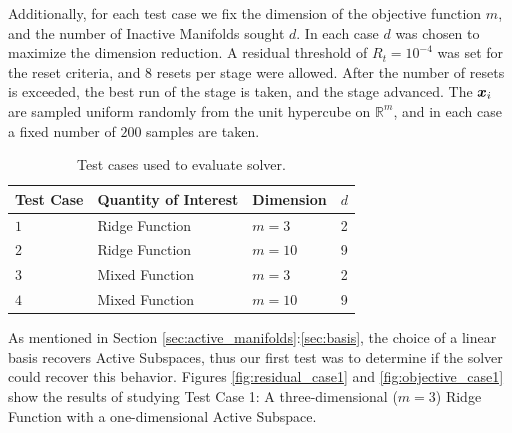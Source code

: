 \documentclass[]{aiaa-tc}%
\begin{document}
Additionally, for each test case we fix the dimension of the objective function $m$, and the number of Inactive Manifolds sought $d$. In each case $d$ was chosen to maximize the dimension reduction. A residual threshold of $R_t=10^{-4}$ was set for the reset criteria, and $8$ resets per stage were allowed. After the number of resets is exceeded, the best run of the stage is taken, and the stage advanced. The $\boldsymbol{x}_i$ are sampled uniform randomly from the unit hypercube on $\mathbb{R}^m$, and in each case a fixed number of $200$ samples are taken.

\begin{table}
\centering
\begin{tabular}{llll}
\toprule
Test Case & Quantity of Interest & Dimension & $d$\\
\midrule
$1$ & Ridge Function & $m=3$ & 2 \\
$2$ & Ridge Function & $m=10$ & 9 \\
$3$ & Mixed Function & $m=3$ & 2 \\
$4$ & Mixed Function & $m=10$ & 9 \\
\bottomrule
\end{tabular}
\caption{Test cases used to evaluate solver.}
\label{tab:tests}
\end{table}

As mentioned in Section \ref{sec:active_manifolds}:\ref{sec:basis}, the choice of a linear basis recovers Active Subspaces, thus our first test was to determine if the solver could recover this behavior. Figures \ref{fig:residual_case1} and \ref{fig:objective_case1} show the results of studying Test Case 1: A three-dimensional ($m=3$) Ridge Function with a one-dimensional Active Subspace.
\end{document}
